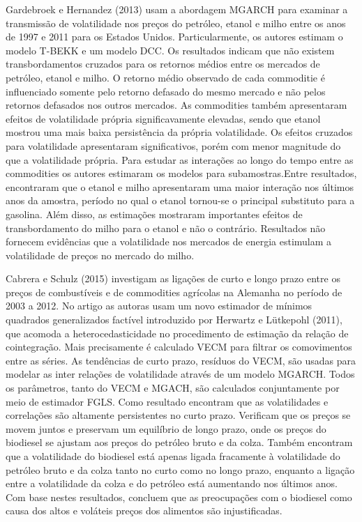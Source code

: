 \documentclass[a4paper,12pt] {article}
\begin{document}
	Gardebroek e Hernandez (2013) usam a abordagem MGARCH para examinar a transmissão de volatilidade nos preços do petróleo, etanol e milho entre os anos de 1997 e 2011 para os Estados Unidos.  Particularmente, os autores estimam o modelo T-BEKK e um modelo DCC. Os resultados indicam que não existem transbordamentos cruzados para os retornos médios entre os   mercados de petróleo, etanol e milho. O retorno médio observado de cada commoditie é influenciado somente pelo retorno defasado do mesmo mercado e não pelos retornos defasados nos outros mercados. As commodities também apresentaram efeitos de volatilidade própria significavamente elevadas, sendo que etanol mostrou uma mais baixa persistência da própria volatilidade. Os efeitos cruzados para volatilidade apresentaram significativos, porém com menor magnitude do que a volatilidade própria. Para estudar as interações ao longo do tempo entre as commodities os autores estimaram os modelos para subamostras.Entre resultados, encontraram  que o etanol e milho apresentaram uma maior interação nos últimos anos da amostra, período no qual o etanol tornou-se o principal substituto para a gasolina. Além disso, as estimações mostraram importantes efeitos de transbordamento do milho para o etanol e não o contrário.  Resultados não fornecem evidências que a volatilidade nos mercados de energia estimulam a volatilidade de preços no mercado do milho. 
	
	Cabrera e Schulz (2015) investigam as ligações de curto e longo prazo entre os preços de combustíveis e de commodities agrícolas na Alemanha no período de 2003 a 2012. No artigo as autoras usam um novo estimador de mínimos quadrados generalizados  factível  introduzido por Herwartz e Lütkepohl (2011), que acomoda a heterocedasticidade no procedimento de estimação da relação de cointegração. Mais precisamente é calculado VECM para filtrar os comovimentos entre as séries. As tendências de curto prazo, resíduos do VECM, são usadas para modelar as inter relações de volatilidade através de um modelo MGARCH. Todos os parâmetros, tanto do VECM e MGACH, são calculados conjuntamente por meio de estimador FGLS. Como resultado encontram que as volatilidades e correlações são altamente persistentes no curto prazo. Verificam que os preços se movem juntos e preservam um equilíbrio de longo prazo,  onde os preços do biodiesel se ajustam aos preços do petróleo bruto e da colza. Também encontram que a volatilidade do biodiesel está apenas ligada fracamente à volatilidade do petróleo bruto e da colza tanto no curto como no longo prazo, enquanto a ligação entre a volatilidade da colza e do petróleo  está aumentando nos últimos anos. Com base nestes resultados, concluem que as preocupações com o biodiesel como causa dos altos e voláteis  preços dos alimentos são  injustificadas.
	
\end{document}
